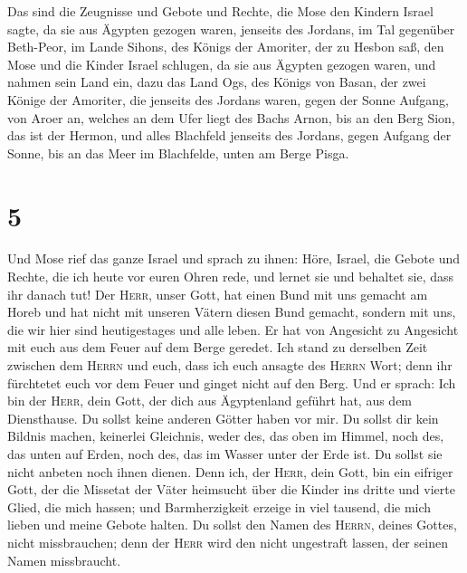  Das sind die Zeugnisse und Gebote und Rechte, die Mose
den Kindern Israel sagte, da sie aus Ägypten gezogen waren,
 jenseits des Jordans, im Tal gegenüber Beth-Peor, im
Lande Sihons, des Königs der Amoriter, der zu Hesbon saß, den Mose und
die Kinder Israel schlugen, da sie aus Ägypten gezogen waren,
 und nahmen sein Land ein, dazu das Land Ogs, des Königs
von Basan, der zwei Könige der Amoriter, die jenseits des Jordans waren,
gegen der Sonne Aufgang,  von Aroer an, welches an dem
Ufer liegt des Bachs Arnon, bis an den Berg Sion, das ist der Hermon,
 und alles Blachfeld jenseits des Jordans, gegen Aufgang
der Sonne, bis an das Meer im Blachfelde, unten am Berge Pisga.

\hypertarget{section-4}{%
\section{5}\label{section-4}}

 Und Mose rief das ganze Israel und sprach zu ihnen: Höre,
Israel, die Gebote und Rechte, die ich heute vor euren Ohren rede, und
lernet sie und behaltet sie, dass ihr danach tut!  Der
\textsc{Herr}, unser Gott, hat einen Bund mit uns gemacht am Horeb
 und hat nicht mit unseren Vätern diesen Bund gemacht,
sondern mit uns, die wir hier sind heutigestages und alle leben.
 Er hat von Angesicht zu Angesicht mit euch aus dem Feuer
auf dem Berge geredet.  Ich stand zu derselben Zeit
zwischen dem \textsc{Herrn} und euch, dass ich euch ansagte des
\textsc{Herrn} Wort; denn ihr fürchtetet euch vor dem Feuer und ginget
nicht auf den Berg. Und er sprach:  Ich bin der
\textsc{Herr}, dein Gott, der dich aus Ägyptenland geführt hat, aus dem
Diensthause.  Du sollst keine anderen Götter haben vor
mir.  Du sollst dir kein Bildnis machen, keinerlei
Gleichnis, weder des, das oben im Himmel, noch des, das unten auf Erden,
noch des, das im Wasser unter der Erde ist.  Du sollst sie
nicht anbeten noch ihnen dienen. Denn ich, der \textsc{Herr}, dein Gott,
bin ein eifriger Gott, der die Missetat der Väter heimsucht über die
Kinder ins dritte und vierte Glied, die mich hassen;  und
Barmherzigkeit erzeige in viel tausend, die mich lieben und meine Gebote
halten.  Du sollst den Namen des \textsc{Herrn}, deines
Gottes, nicht missbrauchen; denn der \textsc{Herr} wird den nicht
ungestraft lassen, der seinen Namen missbraucht.

